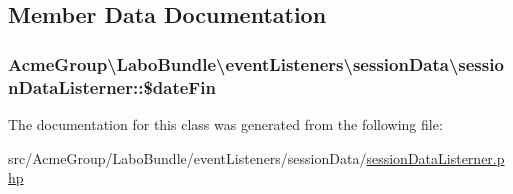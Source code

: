 \subsection{Member Data Documentation}
\hypertarget{class_acme_group_1_1_labo_bundle_1_1event_listeners_1_1session_data_1_1session_data_listerner_ac2b265b48a01295ef21193682378173e}{
\subsubsection[{\$date\+Fin}]{\setlength{\rightskip}{0pt plus 5cm}Acme\+Group\textbackslash{}\+Labo\+Bundle\textbackslash{}event\+Listeners\textbackslash{}session\+Data\textbackslash{}session\+Data\+Listerner\+::\$date\+Fin\hspace{0.3cm}{\ttfamily [protected]}}}\label{class_acme_group_1_1_labo_bundle_1_1event_listeners_1_1session_data_1_1session_data_listerner_ac2b265b48a01295ef21193682378173e}


The documentation for this class was generated from the following file\+:\begin{DoxyCompactItemize}
\item 
src/\+Acme\+Group/\+Labo\+Bundle/event\+Listeners/session\+Data/\hyperlink{session_data_listerner_8php}{session\+Data\+Listerner.\+php}\end{DoxyCompactItemize}
